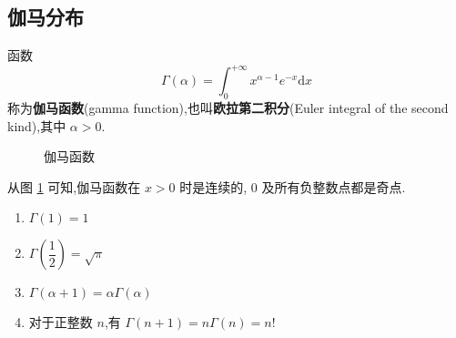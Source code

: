 \subsection{伽马分布}

\begin{definition}
    \indent 函数
    \begin{equation} \label{equation:gamma}
        \Gamma(\alpha) = \int_{0}^{+\infty} x^{\alpha - 1} e^{-x} \text{d}x
    \end{equation}
    称为\textbf{伽马函数}(gamma function),也叫\textbf{欧拉第二积分}(Euler integral of the second kind),其中 $\alpha > 0$.
\end{definition}

\begin{figure}[htbp]
    \centering


    \caption{伽马函数}
    \label{fig:伽马函数}
\end{figure}

从图 \ref{fig:伽马函数} 可知,伽马函数在 $x>0$ 时是连续的, $0$ 及所有负整数点都是奇点.

\begin{property}[][伽马函数的性质]
    \begin{enumerate}
        \item $\Gamma(1) = 1$ \vspace{0.5em}
        \item $\Gamma(\dfrac{1}{2}) = \sqrt{\pi}$ \vspace{0.5em}
        \item $\Gamma(\alpha + 1) = \alpha \Gamma(\alpha)$
        \item 对于正整数 $n$,有 $\Gamma(n+1) = n \Gamma(n) = n!$
    \end{enumerate}
\end{property}


